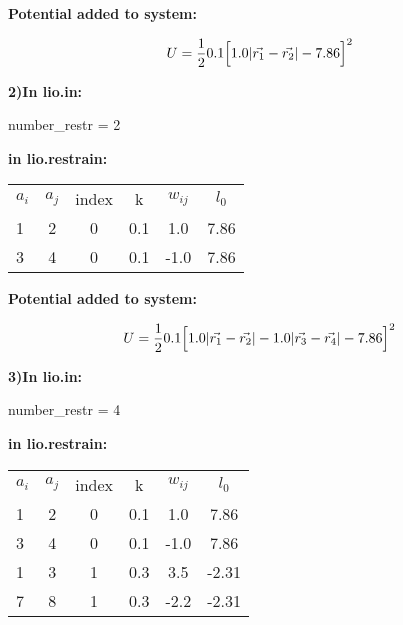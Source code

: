 \documentclass[journal=jctcce,manuscript=article]{achemso}
\begin{document}
    \textbf{Potential added to system:}

    \begin{equation}
      U=\frac{1}{2} 0.1 \Big{[} 1.0 |\vec{r_1} - \vec{r_2}| - 7.86\Big{]}^2  
      \label{Ex1}
    \end{equation}


    \textbf{2)In lio.in:}

    number\_restr = 2

    \textbf{in lio.restrain:}

    \begin{table}  [H]
      \begin{center}
      \begin{tabular}{ l c c c c c}
         $a_i$ & $a_j$ & index &   k  &    $w_{ij}$   &  $l_0$    \\
         1  &  2 &   0   &  0.1 &    1.0   & 7.86   \\
         3  &  4 &   0   &  0.1 &   -1.0   & 7.86   \\
       \end{tabular}
       \end{center}
      \label{Tex2}
    \end{table}

    \textbf{Potential added to system:}

    \begin{equation}
      U=\frac{1}{2} 0.1 \Big{[} 1.0 |\vec{r_1} - \vec{r_2}| - 1.0 |\vec{r_3} - \vec{r_4}| - 7.86\Big{]}^2  
      \label{Ex2}
    \end{equation}


    \textbf{3)In lio.in:}

    number\_restr = 4

    \textbf{in lio.restrain:}

    \begin{table}  [H]
      \begin{center}
      \begin{tabular}{ l c c c c c}
         $a_i$ & $a_j$ & index &   k  &    $w_{ij}$   &  $l_0$    \\
         1  &  2 &   0   &  0.1 &    1.0   & 7.86   \\
         3  &  4 &   0   &  0.1 &   -1.0   & 7.86   \\
         1  &  3 &   1   &  0.3 &    3.5   & -2.31   \\
         7  &  8 &   1   &  0.3 &   -2.2   & -2.31   \\
       \end{tabular}
       \end{center}
      \label{Tex3}
    \end{table}
\end{document}
